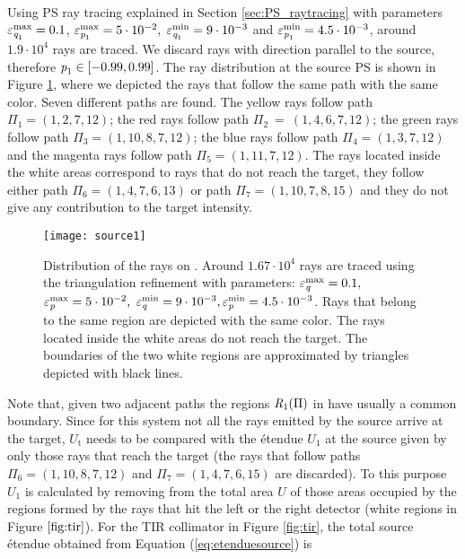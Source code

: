 \\ \indent
Using PS ray tracing explained in Section \ref{sec:PS_raytracing} with parameters $\varepsilon_{\textit{q}_1}^{\textrm{max}} = 0.1$, $ \varepsilon_{\textit{p}_1}^\textrm{max} = 5\cdot 10^{-2}, $ $\varepsilon_{\textit{q}_1}^\textrm{min} = 9\cdot 10^{-3}$ and $\varepsilon_{\textit{p}_1}^\textrm{min} = 4.5 \cdot 10^{-3}$, around $1.9 \cdot 10^4$ rays are traced. 
We discard rays with direction parallel to the source, therefore $\textit{p}_1 \in [-0.99, 0.99]$. The ray distribution at the source PS  is shown in Figure \ref{fig:sourcePS}, where we depicted the rays that follow the same path with the same color. Seven different paths are found. The yellow rays follow path $\Pi_1 = (1, 2, 7, 12)$;
   the red rays follow path $\Pi_2 ~= ~(1, 4, 6, 7, 12)$; the green rays follow path $\Pi_3 = (1, 10, 8, 7, 12)$;
   the blue rays follow path $\Pi_4= (1, 3, 7, 12)$ and the magenta rays follow path $\Pi_5= (1, 11, 7, 12)$. The rays located inside the white areas correspond to rays that do not reach the target, they follow either path $\Pi_6 = (1, 4, 7, 6, 13)$ or path $\Pi_7 = (1,10,7,8,15)$ and they do not give any contribution to the target intensity.
\begin{figure}[h]
  \begin{center}
  \texttt{[image: source1]}
  \end{center}
  \caption{Distribution of the rays on . Around $1.67 \cdot 10^4$ rays are traced using the triangulation refinement with parameters:
  $\varepsilon_{\textit{q}}^\textrm{max} = 0.1 ,$ $ \varepsilon_{\textit{p}}^\textrm{max} = 5\cdot 10^{-2}, $ $\varepsilon_{\textit{q}}^\textrm{min} = 9\cdot 10^{-3}, \varepsilon_{\textit{p}}^\textrm{min} = 4.5 \cdot 10^{-3}$. Rays that belong to the same region are depicted with the same color. The rays located inside the white areas do not reach the target. The boundaries of the two white regions are approximated by triangles depicted with black lines.}
  \label{fig:sourcePS}
\end{figure}
Note that, given two adjacent paths the regions $\mbox{$\emph{R}_{\textit{$1$}}$}(\Pi)$ in  have usually a common boundary. 
Since for this system not all the rays emitted by the source arrive at the target, $U_{\textrm{t}}$ needs to be compared with the \'{e}tendue $U_1$ at the source given by only those rays that reach the target (the rays that follow paths $\Pi_6=(1,10,8,7,12)$ and 
$\Pi_7 = (1,4,7,6,15)$ are discarded). To this purpose $U_1$ is calculated by removing from the total area $U$ of  those areas occupied by the regions formed by the rays that hit the left or the right detector (white regions in Figure $\ref{fig:tir}$).  For the TIR collimator in Figure \ref{fig:tir}, the total source  \'{e}tendue obtained from Equation (\ref{eq:etenduesource}) is
